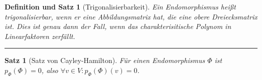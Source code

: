 \documentclass[a4paper]{article}
\newcounter{Sec}
\theoremstyle{marginbreak}
\newtheorem{satz}[definition]{Satz}
\newtheorem{defsatz}[definition]{Definition und Satz}
\newcommand{\sep}{%
	\rule{\textwidth}{0.3pt}%
	\stepcounter{Sec}%
	}
\begin{document}
	\begin{defsatz}[Trigonalisierbarkeit]
		Ein Endomorphismus heißt trigonalisierbar, wenn er eine Abbildungsmatrix hat,
		die eine obere Dreiecksmatrix ist. Dies ist genau dann der Fall, wenn das
		charakterisitische Polynom in Linearfaktoren zerfällt.
	\end{defsatz}
	\sep
	\begin{satz}[Satz von Cayley-Hamilton]
		Für einen Endomorphismus $\Phi$ ist $p_\Phi(\Phi) = 0$, also $\forall v\in V: p_\Phi(\Phi)(v) = 0$.
	\end{satz}
\end{document}
